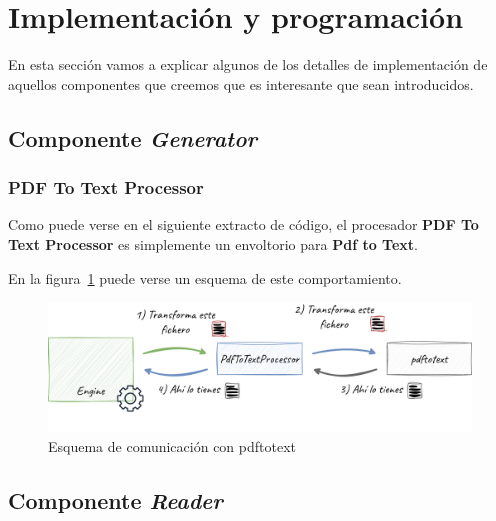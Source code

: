 \section{Implementación y programación}\label{sec:implemetacion_y_programacion}

En esta sección vamos a explicar algunos de los detalles de implementación de aquellos componentes que creemos que es
interesante que sean introducidos.

\subsection*{Componente \textit{Generator}}

\subsubsection*{PDF To Text Processor}

Como puede verse en el siguiente extracto de código, el procesador \textbf{PDF To Text Processor} es simplemente un
envoltorio para \textbf{Pdf to Text}.



En la figura~\ref{fig:chapter_4.generator_component_pdf_to_text_processor} puede verse un esquema de este
comportamiento.

\begin{figure}[ht]
    \begin{center}
        \includegraphics[width=\textwidth]{./chapter/4/images/chapter_4.generator_component_pdf_to_text_processor}
        \caption{Esquema de comunicación con pdftotext}
        \label{fig:chapter_4.generator_component_pdf_to_text_processor}
    \end{center}
\end{figure}

\subsection*{Componente \textit{Reader}}

